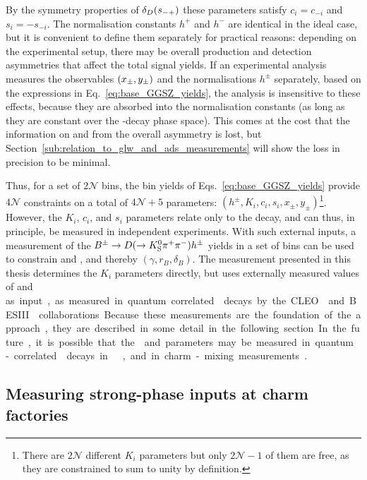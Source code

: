 By the symmetry properties of $\delta_D(s_{-+})$ these parameters satisfy ${c_i=c_{-i}}$ and ${s_i=-s_{-i}}$. The normalisation constants $h^+$ and $h^-$ are identical in the ideal case, but it is convenient to define them separately for practical reasons: depending on the experimental setup, there may be overall production and detection asymmetries that affect the total signal yields. If an experimental analysis measures the \CP observables $(x_\pm, y_\pm)$ and the normalisations $h^\pm$ separately, based on the expressions in Eq.~\eqref{eq:base_GGSZ_yields}, the analysis is insensitive to these effects, because they are absorbed into the normalisation constants (as long as they are constant over the \D-decay phase space). This comes at the cost that the information on \xpm and \ypm from the overall \CP asymmetry is lost, but Section~\ref{sub:relation_to_glw_and_ads_measurements} will show the loss in precision to be minimal.

Thus, for a set of 2$\mathcal N$ bins, the bin yields of Eqs.~\eqref{eq:base_GGSZ_yields} provide $4\mathcal N$ constraints on a total of $4\mathcal N+5$  parameters: $(h^\pm, K_i, c_i, s_i, x_\pm, y_\pm)$\footnote{There are $2\mathcal N$ different $K_i$ parameters but only $2\mathcal N -1$ of them are free, as they are constrained to sum to unity by definition.}. However, the $K_i$, $c_i$, and $s_i$ parameters relate only to the \D decay, and can thus, in principle, be measured in independent experiments. With such external inputs, a measurement of the ${{B}^\pm}\rightarrow D(\rightarrow{\ensuremath{{K}^0_{\mathrm{S}}}}{\ensuremath{{\pi}^+}}{\ensuremath{{\pi}^-}})h^\pm$ yields in a set of bins can be used to constrain \xpm and \ypm, and thereby $(\gamma, r_B, \delta_B)$. The measurement presented in this thesis determines the $K_i$ parameters directly, but uses externally measured values of \ci and \si as input, as measured in quantum correlated \D decays by the CLEO~\cite{CLEOCISI} and BESIII~\cite{BESCISI,BESCISIKSKK} collaborations. Because these measurements are the foundation of the approach, they are described in some detail in the following section. In the future, it is possible that the \ci and \si parameters may be measured in quantum-correlated \D decays in \lhcb~\cite{LHCb-PAPER-2019-005}, and in charm-mixing measurements~\cite{thomasModelindependentOverlineDMixing2012}.




\subsection{Measuring strong-phase inputs at charm factories} %
\label{sub:measuring_strong_phase_inputs_at_charm_factories}


